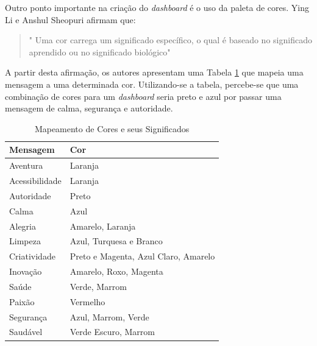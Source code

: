 Outro ponto importante na criação do \textit{dashboard} é o uso da paleta de cores. Ying Li e Anshul Sheopuri \cite{li_creative_2015} afirmam que:
\begin{quote}
" Uma cor carrega um significado específico, o qual é baseado no significado aprendido ou no significado biológico"
\end{quote}

 A partir desta afirmação, os autores apresentam uma Tabela \ref{table:cor_significado} que mapeia uma mensagem a uma determinada cor. Utilizando-se a tabela, percebe-se que uma combinação de cores para um \textit{dashboard} seria preto e azul por passar uma mensagem de calma, segurança e autoridade.
\begin{table}[H]
\centering
\caption{Mapeamento de Cores e seus Significados}
\label{table:cor_significado}
\begin{tabular}{|ll|}
\hline
\textbf{Mensagem} & \textbf{Cor}                         \\ \hline
Aventura          & Laranja                              \\ \hline
Acessibilidade    & Laranja                              \\ \hline
Autoridade        & Preto                                \\ \hline
Calma             & Azul                                 \\ \hline
Alegria           & Amarelo, Laranja                     \\ \hline
Limpeza           & Azul, Turquesa e Branco              \\ \hline
Criatividade      & Preto e Magenta, Azul Claro, Amarelo \\ \hline
Inovação          & Amarelo, Roxo, Magenta               \\ \hline
Saúde             & Verde, Marrom                        \\ \hline
Paixão            & Vermelho                             \\ \hline
Segurança         & Azul, Marrom, Verde                  \\ \hline
Saudável          & Verde Escuro, Marrom                 \\ \hline
\end{tabular}
\end{table}

